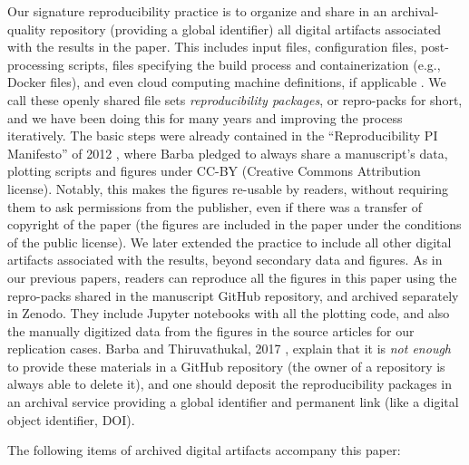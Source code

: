 Our signature reproducibility practice is to organize and share in an archival-quality repository (providing a global identifier) all digital artifacts associated with the results in the paper. 
This includes input files, configuration files, post-processing scripts, files specifying the build process and containerization (e.g., Docker files), and even cloud computing machine definitions, if applicable \cite{mesnard-barba2019}.
We call these openly shared file sets \emph{reproducibility packages}, or repro-packs for short, and we have been doing this for many years and improving the process iteratively. 
The basic steps were already contained in the ``Reproducibility PI Manifesto'' of 2012 \cite{barba2012manifesto}, where Barba pledged to always share a manuscript's data, plotting scripts and figures under CC-BY (Creative Commons Attribution license).
Notably, this makes the figures re-usable by readers, without requiring them to ask permissions from the publisher, even if there was a transfer of copyright of the paper (the figures are included in the paper under the conditions of the public license). 
We later extended the practice to include all other digital artifacts associated with the results, beyond secondary data and figures. 
As in our previous papers, readers can reproduce all the figures in this paper using the repro-packs shared in the manuscript GitHub repository, and archived separately in Zenodo. 
They include Jupyter notebooks with all the plotting code, and also the manually digitized data from the figures in the source articles for our replication cases.
Barba and Thiruvathukal, 2017 \cite{BarbaThiruvathukal2017}, explain that it is \emph{not enough} to provide these materials in a GitHub repository (the owner of a repository is always able to delete it), and one should deposit the reproducibility packages in an archival service providing a global identifier and permanent link (like a digital object identifier, DOI).

The following items of archived digital artifacts accompany this paper:


